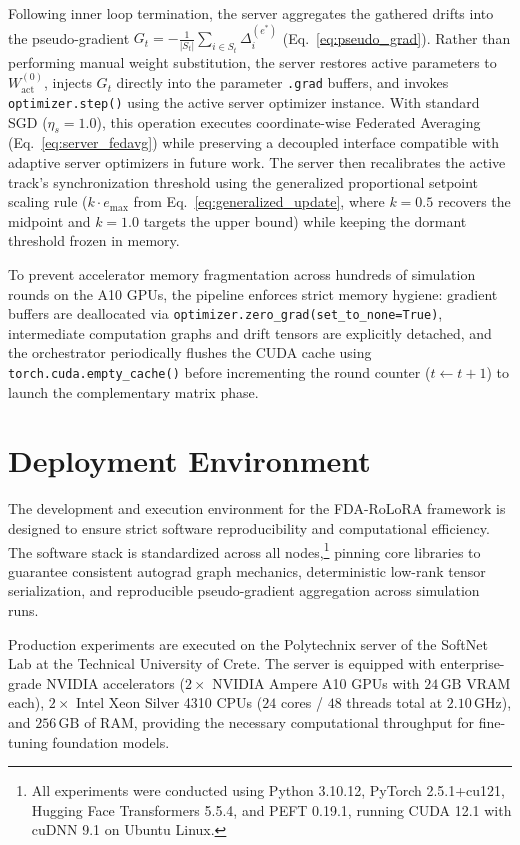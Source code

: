Following inner loop termination, the server aggregates the gathered drifts into the pseudo-gradient $G_t = -\frac{1}{|S_t|} \sum_{i \in S_t} \Delta_i^{(e^*)}$ (Eq.~\ref{eq:pseudo_grad}). Rather than performing manual weight substitution, the server restores active parameters to $W_{\text{act}}^{(0)}$, injects $G_t$ directly into the parameter \texttt{.grad} buffers, and invokes \texttt{optimizer.step()} using the active server optimizer instance. With standard SGD ($\eta_s = 1.0$), this operation executes coordinate-wise Federated Averaging (Eq.~\ref{eq:server_fedavg}) while preserving a decoupled interface compatible with adaptive server optimizers in future work. The server then recalibrates the active track's synchronization threshold using the generalized proportional setpoint scaling rule ($k \cdot e_{\max}$ from Eq.~\ref{eq:generalized_update}, where $k=0.5$ recovers the midpoint and $k=1.0$ targets the upper bound) while keeping the dormant threshold frozen in memory.

To prevent accelerator memory fragmentation across hundreds of simulation rounds on the A10 GPUs, the pipeline enforces strict memory hygiene: gradient buffers are deallocated via \texttt{optimizer.zero\_grad(set\_to\_none=True)}, intermediate computation graphs and drift tensors are explicitly detached, and the orchestrator periodically flushes the CUDA cache using \texttt{torch.cuda.empty\_cache()} before incrementing the round counter ($t \leftarrow t + 1$) to launch the complementary matrix phase.

\section{Deployment Environment}
\label{sec:impl_deployment}

The development and execution environment for the FDA-RoLoRA framework is designed to ensure strict software reproducibility and computational efficiency. The software stack is standardized across all nodes,\footnote{All experiments were conducted using Python 3.10.12, PyTorch 2.5.1+cu121, Hugging Face Transformers 5.5.4, and PEFT 0.19.1, running CUDA 12.1 with cuDNN 9.1 on Ubuntu Linux.} pinning core libraries to guarantee consistent autograd graph mechanics, deterministic low-rank tensor serialization, and reproducible pseudo-gradient aggregation across simulation runs.
 
Production experiments are executed on the Polytechnix server of the SoftNet Lab at the Technical University of Crete. The server is equipped with enterprise-grade NVIDIA accelerators ($2 \times$ NVIDIA Ampere A10 GPUs with $24\,\text{GB}$ VRAM each), $2 \times$ Intel Xeon Silver 4310 CPUs ($24$ cores / $48$ threads total at $2.10\,\text{GHz}$), and $256\,\text{GB}$ of RAM, providing the necessary computational throughput for fine-tuning foundation models.
 
